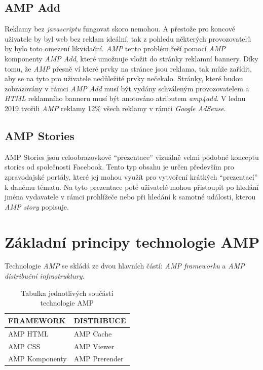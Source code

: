 \subsection*{AMP Add}
Reklamy bez \emph{javascriptu} fungovat skoro nemohou. A přestože pro koncové uživatele by byl web bez reklam ideální, tak z pohledu některých provozovatelů by bylo toto omezení likvidační. \emph{AMP} tento problém řeší pomocí \emph{AMP} komponenty \emph{AMP Add}, které umožnuje vložit do stránky reklamní bannery. Díky tomu, že \emph{AMP} přesně ví které prvky na stránce jsou reklama, tak může zařídit, aby se na tyto pro uživatele nedůležité prvky nečekalo. Stránky, které budou zobrazovány v rámci \emph{AMP Add} musí být vydány schváleným provozovatelem a \emph{HTML} reklamního banneru musí být anotováno atributem \emph{amp4add}\cite[Ch.\ 6, p.\ 280]{VzhuruDoAMP}.
V lednu 2019 tvořili \emph{AMP} reklamy 12\% všech reklamy v rámci \emph{Google AdSense}\cite{abner_2019}.
\subsection*{AMP Stories}
AMP Stories jsou celoobrazovkové “prezentace” vizuálně velmi podobné konceptu stories od společnosti Facebook. Tento typ obsahu je určen především pro zpravodajské portály, které jej mohou využít pro vytvoření krátkých
“prezentací” k danému tématu. Na tyto prezentace poté uživatelé mohou přistoupit po hledání jména
vydavatele v rámci prohlížeče nebo při hledání k samotné události, kterou \emph{AMP story} popisuje\cite[Ch.\ 6, p.\ 290]{VzhuruDoAMP}.

\section{Základní principy technologie AMP}
Technologie \emph{AMP} se skládá ze dvou hlavních částí: \emph{AMP frameworku} a \emph{AMP distribuční infrastruktury}. 

\begin{table}[H]
	\caption{Tabulka jednotlivých součástí technologie AMP} 
	\centering
	\begin{tabular}{m{15em} | m{15em}}
		\toprule
		\cmidrule(r){1-2}
		FRAMEWORK & DISTRIBUCE \\
		\midrule
		AMP HTML & AMP Cache \\
		AMP CSS & AMP Viewer \\
		AMP Komponenty & AMP Prerender \\
		\bottomrule
	\end{tabular}
	\label{tab:Součásti technologie AMP}
\end{table}


